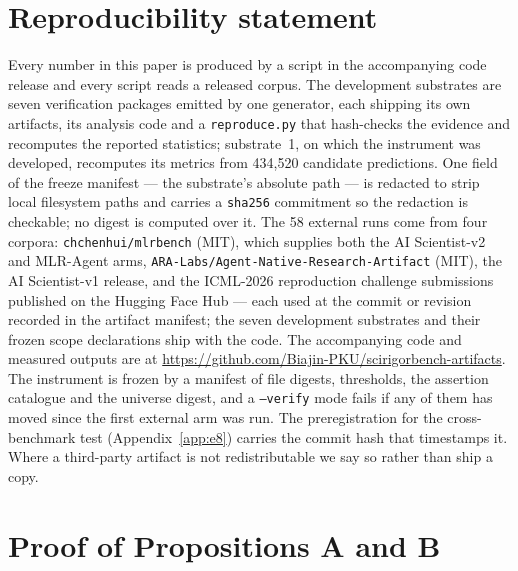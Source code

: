 \documentclass[10pt]{article}
\newcommand{\RM}[1]{{#1}}
\begin{document}
\section*{Reproducibility statement}
Every number in this paper is produced by a script in the accompanying code
release and every script reads a released corpus. The development substrates are
seven verification packages emitted by one generator, each shipping its own
artifacts, its analysis code and a \texttt{reproduce.py} that hash-checks the
evidence and recomputes the reported statistics; substrate~1, on which the
instrument was developed, recomputes its metrics from \RM{434{,}520} candidate
predictions. One field of the freeze manifest --- the substrate's absolute path
--- is redacted to strip local filesystem paths and carries a \texttt{sha256}
commitment so the redaction is checkable; no digest is computed over it.
The \RM{58} external runs come from four corpora:
\texttt{chchenhui/mlrbench} (MIT), which supplies both the AI Scientist-v2 and
MLR-Agent arms, \texttt{ARA-Labs/Agent-Native-Research-Artifact} (MIT), the AI
Scientist-v1 release, and the ICML-2026 reproduction challenge submissions
published on the Hugging Face Hub --- each used at the commit or revision
recorded in the artifact manifest; the seven development substrates and their
frozen scope declarations ship with the code. The accompanying code and measured outputs are at
\url{https://github.com/Biajin-PKU/scirigorbench-artifacts}. The
instrument is frozen by a manifest of file digests, thresholds, the assertion
catalogue and the universe digest, and a \texttt{--verify} mode fails if any of
them has moved since the first external arm was run. The preregistration for the cross-benchmark test
(Appendix~\ref{app:e8}) carries the commit hash that timestamps it. Where a
third-party artifact is not redistributable we say so rather than ship a copy.



\appendix
\section{Proof of Propositions A and B}
\label{app:hierseq_proof}
\end{document}
